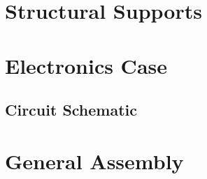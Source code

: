 \blindtext

\blindtext

\section{Structural Supports}

\blindtext

\blindtext

\section{Electronics Case}

\blindtext

\subsection{Circuit Schematic}

\blindtext

\section{General Assembly}

\blindtext

\blindtext